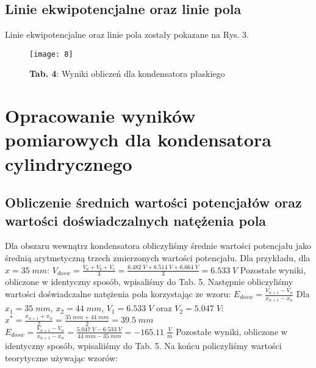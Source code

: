 \documentclass[12pt]{article}
\begin{document}
\subsection{Linie ekwipotencjalne oraz linie pola}
Linie ekwipotencjalne oraz linie pola zostały pokazane na Rys. 3.
\begin{figure}[H]
\centering
\texttt{[image: 8]}
\caption*{\textbf{Tab. 4}: Wyniki obliczeń dla kondensatora płaskiego}
\end{figure} \newpage
\section{Opracowanie wyników pomiarowych dla kondensatora cylindrycznego}
\subsection{Obliczenie średnich wartości potencjałów oraz wartości doświadczalnych natężenia pola}
Dla obszaru wewnątrz kondensatora obliczyliśmy średnie wartości potencjału jako średnią arytmetyczną trzech zmierzonych wartości potencjału. Dla przykładu, dla $x=35\;mm$: \newline \newline
{\Large $V_{dosw}=\frac{V_a+V_b+V_c}{3}=\frac{6.482\;V+6.514\;V+6.664\;V}{3}=6.533\;V$} \newline \newline
Pozostałe wyniki, obliczone w identyczny sposób, wpisaliśmy do Tab. 5. \newline 
Następnie obliczyliśmy wartości doświadczalne natężenia pola korzystając ze wzoru: \newline \newline
{\Large $E_{dosw}=\frac{V_{n+1}-V_n}{x_{n+1}-x_n}$} \newline \newline
Dla $x_1=35\;mm$, $x_2=44\;mm$, $V_1=6.533\;V$ oraz $V_2=5.047\;V$: \newline \newline
{\Large $x^*=\frac{x_{n+1}+x_n}{2}=\frac{35\;mm+44\;mm}{2}=39.5\;mm$ \newline \newline
$E_{dosw}=\frac{V_{n+1}-V_n}{x_{n+1}-x_n}=\frac{5.047\;V-6.533\;V}{44\;mm-35\;mm}=-165.11\;\frac{V}{m}$} \newline \newline
Pozostałe wyniki, obliczone w identyczny sposób, wpisaliiśmy do Tab. 5. \newline
Na końcu policzyliśmy wartości teorytyczne używając wzorów: \newline \newline
\end{document}
